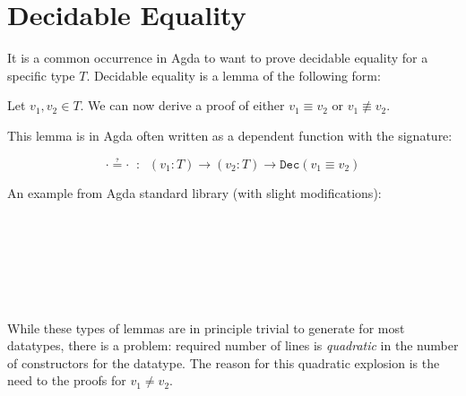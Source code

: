 \section{Decidable Equality}

It is a common occurrence in Agda to want to prove decidable equality for a
specific type $T$. Decidable equality is a lemma of the following form:

\begin{lemma}
  Let $v_1, v_2 \in T$. We can now derive a proof of either $v_1 \equiv v_2$ or
  $v_1 \not\equiv v_2$.
\end{lemma}

This lemma is in Agda often written as a dependent function with the signature:

$$\cdot ≟ \cdot\;\;:\;\;(v_1 : T) \to (v_2 : T) \to \mathtt{Dec}(v_1 \equiv v_2)$$

An example from Agda standard library (with slight modifications):

\begin{code}%
\>\<%
\\
\> \AgdaSymbol{:} \AgdaSymbol{(} \AgdaSymbol{:} \AgdaSymbol{)}  \AgdaSymbol{(} \AgdaSymbol{:} \AgdaSymbol{)}   \AgdaSymbol{(}  \AgdaSymbol{)}\<%
\\
\> \<[6]%
\>[6]  \<[14]%
\>[14]\AgdaSymbol{=}  \<%
\\
\>   \AgdaSymbol{=}  \<%
\\
\> \<[6]%
\>[6]  \AgdaSymbol{=}  \<%
\\
\>   \<[14]%
\>[14]\AgdaSymbol{=}  \<%
\end{code}

\paragraph{}
While these types of lemmas are in principle trivial to generate for most
datatypes, there is a problem: required number of lines is \emph{quadratic} in
the number of constructors for the datatype. The reason for this quadratic
explosion is the need to the proofs for $v_1 \neq v_2$.

